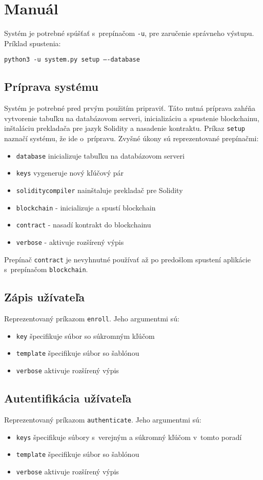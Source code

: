 \chapter{Manuál}

Systém je potrebné spúšťať s~prepínačom \texttt{-u}, pre zaručenie správneho výstupu. Príklad spustenia:

\texttt{python3 -u system.py setup ----database}

\section{Príprava systému}
Systém je potrebné pred prvým použitím pripraviť. Táto nutná príprava zahŕňa vytvorenie tabuľku na databázovom serveri, inicializáciu a spustenie blockchainu, inštaláciu prekladača pre jazyk Solidity a nasadenie kontraktu. 
Príkaz \texttt{setup} naznačí systému, že ide o~prípravu. Zvyšné úkony sú reprezentované prepínačmi:
\begin{itemize}
    \item{\texttt{database} inicializuje tabuľku na databázovom serveri}
    \item{\texttt{keys} vygeneruje nový kľúčový pár}
    \item{\texttt{soliditycompiler} nainštaluje prekladač pre Solidity}
    \item{\texttt{blockchain} - inicializuje a spustí blockchain}
    \item{\texttt{contract} - nasadí kontrakt do blockchainu}
    \item{\texttt{verbose} - aktivuje rozšírený výpis}
\end{itemize}

Prepínač \texttt{contract} je nevyhnutné používať až po predošlom spustení aplikácie s~prepínačom \texttt{blockchain}.

\section{Zápis užívateľa}
Reprezentovaný príkazom  \texttt{enroll}. Jeho argumentmi sú:
\begin{itemize}
    \item{\texttt{key} špecifikuje súbor so súkromným kľúčom}
    \item{\texttt{template} špecifikuje súbor so šablónou}
    \item{\texttt{verbose} aktivuje rozšírený výpis}
\end{itemize}

\section{Autentifikácia užívateľa}
Reprezentovaný príkazom  \texttt{authenticate}. Jeho argumentmi sú:
\begin{itemize}
    \item{\texttt{keys} špecifikuje súbory s~verejným a súkromný kľúčom v~tomto poradí}
    \item{\texttt{template} špecifikuje súbor so šablónou}
    \item{\texttt{verbose} aktivuje rozšírený výpis}
\end{itemize}


